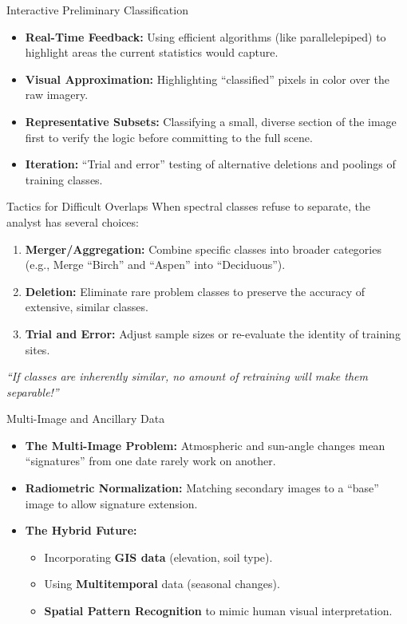 \documentclass[aspectratio=169]{beamer}
\begin{document}
\begin{frame}{Interactive Preliminary Classification}
    \begin{itemize}
        \item \textbf{Real-Time Feedback:} Using efficient algorithms (like parallelepiped) to highlight areas the current statistics would capture.
        \item \textbf{Visual Approximation:} Highlighting ``classified'' pixels in color over the raw imagery.
        \item \textbf{Representative Subsets:} Classifying a small, diverse section of the image first to verify the logic before committing to the full scene.
        \item \textbf{Iteration:} ``Trial and error'' testing of alternative deletions and poolings of training classes.
    \end{itemize}
\end{frame}

\begin{frame}{Tactics for Difficult Overlaps}
    When spectral classes refuse to separate, the analyst has several choices:
    \vspace{0.2cm}
    \begin{enumerate}
        \item \textbf{Merger/Aggregation:} Combine specific classes into broader categories (e.g., Merge ``Birch'' and ``Aspen'' into ``Deciduous'').
        \item \textbf{Deletion:} Eliminate rare problem classes to preserve the accuracy of extensive, similar classes.
        \item \textbf{Trial and Error:} Adjust sample sizes or re-evaluate the identity of training sites.
    \end{enumerate}
    \vfill
    \centering
    \textit{``If classes are inherently similar, no amount of retraining will make them separable!''}
\end{frame}

\begin{frame}{Multi-Image and Ancillary Data}
    \begin{itemize}
        \item \textbf{The Multi-Image Problem:} Atmospheric and sun-angle changes mean ``signatures'' from one date rarely work on another.
        \item \textbf{Radiometric Normalization:} Matching secondary images to a ``base'' image to allow signature extension.
        \item \textbf{The Hybrid Future:}
        \begin{itemize}
            \item Incorporating \textbf{GIS data} (elevation, soil type).
            \item Using \textbf{Multitemporal} data (seasonal changes).
            \item \textbf{Spatial Pattern Recognition} to mimic human visual interpretation.
        \end{itemize}
    \end{itemize}
\end{frame}
\end{document}
